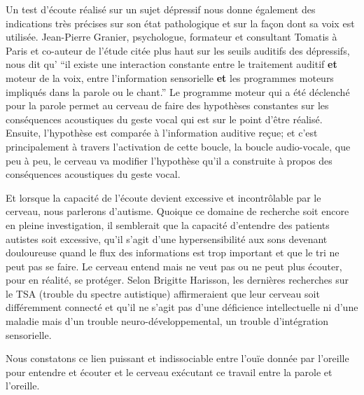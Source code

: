 Un test d'écoute réalisé sur un sujet dépressif nous donne également des indications
très précises sur son état
pathologique et sur la façon dont sa voix est utilisée. Jean-Pierre
Granier, psychologue, formateur et consultant Tomatis à Paris et
co-auteur de l'étude citée plus haut sur les seuils auditifs des dépressifs, nous dit qu' 
``il existe une 
interaction
constante entre le traitement auditif \textbf{et} moteur de la
voix, entre l'information sensorielle \textbf{et} les programmes moteurs impliqués
dans la parole ou le chant.'' Le programme moteur qui a été déclenché
pour la parole permet au cerveau de faire des hypothèses constantes
sur les conséquences acoustiques du geste vocal qui est sur le point
d'être réalisé. Ensuite, l'hypothèse est comparée à l'information
auditive reçue; et c'est principalement à travers l'activation de cette boucle, la
boucle audio-vocale, que peu à peu, le cerveau va modifier l'hypothèse
qu'il a construite à propos des conséquences acoustiques du geste vocal.





Et lorsque la capacité de l'écoute devient excessive et incontrôlable par le cerveau, nous 
parlerons d'autisme. Quoique
  ce domaine de recherche  soit encore en pleine investigation, il semblerait que la capacité 
  d'entendre des patients autistes soit excessive, qu'il s'agit d'une hypersensibilité aux sons 
  devenant douloureuse quand  le flux des informations est trop important et que le tri ne 
  peut pas se faire. Le cerveau entend mais ne veut pas ou ne peut plus  écouter, pour en 
  réalité, se protéger.
Selon Brigitte Harisson,  
 les dernières recherches sur le TSA (trouble du spectre autistique) affirmeraient que leur
  cerveau soit différemment connecté et qu'il ne s'agit pas d'une déficience intellectuelle ni
   d'une maladie mais d'un trouble neuro-développemental, un trouble
  d'intégration sensorielle.\autocite[Cet ouvrage propose une description unique du TSA
   (trouble du spectre de l'autisme pp. 22--23)]{harrisson.st-charles:lautisme}

Nous constatons ce lien puissant et indissociable  entre l'ouïe donnée
par l'oreille pour entendre et écouter et le cerveau exécutant ce
travail entre la 
parole et l'oreille.








